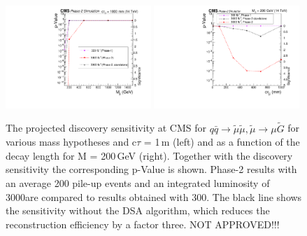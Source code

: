 \begin{figure}[t]\begin{center}
\includegraphics[width=0.49\textwidth]{figures/SignificanceComp.pdf}
\includegraphics[width=0.49\textwidth]{figures/SignificanceComp_asfuncofCtau.pdf}
\caption{The projected discovery sensitivity at CMS for  $q \bar q \to \widetilde{\mu} \widetilde{\mu}, \widetilde{\mu}\rightarrow \mu\widetilde{G}$ 
for various mass hypotheses and c$\tau$ = 1\,m (left) and as a function of the decay length for M = 200\,GeV (right). Together with the discovery sensitivity the corresponding p-Value is shown. Phase-2 results with an average 200 pile-up events and an integrated luminosity of 3000\fbinv are compared to results obtained with 300\fbinv. The black line shows the sensitivity without the DSA algorithm, which reduces the reconstruction efficiency by a factor three. NOT APPROVED!!!
 }
\label{fig:displResultsSensitiviy}
\end{center}
\end{figure}


